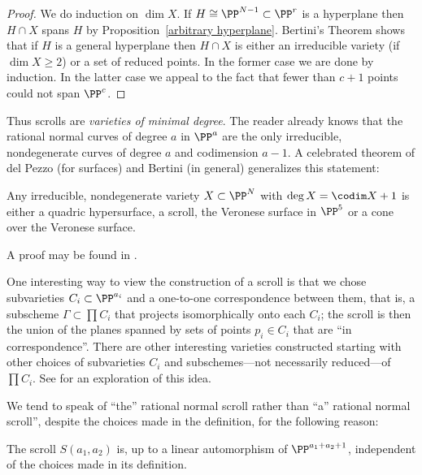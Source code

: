\begin{proof} We do induction on $\dim X$. If $H\cong \PP^{N-1}\subset \PP^r$ is a hyperplane then $H\cap X$ spans
$H$ by Proposition~\ref{arbitrary hyperplane}. Bertini's Theorem shows that if $H$ is a general hyperplane then $H\cap X$ is either an irreducible variety 
(if $\dim X\geq 2$) or a set of reduced points. In the former case we are done by induction. In the latter case
we appeal to the fact that fewer than $c+1$ points could not span $\PP^c$.
 \end{proof}

Thus scrolls are \emph{varieties of minimal degree}. The reader already knows that the rational normal curves of degree $a$ in $\PP^{a}$ are the only irreducible, nondegenerate curves of degree $a$ and codimension $a-1$. A celebrated theorem of del Pezzo (for surfaces) and Bertini (in general) generalizes this statement:

\begin{fact}\label{classification of scrolls} 
Any irreducible, nondegenerate variety $X\subset \PP^{N}$  with $\deg X = \codim X+1$ is either a quadric hypersurface, a scroll, the Veronese surface in $\PP^{5}$ or a cone over the Veronese surface.
\end{fact}

A proof may be found in \cite{Eisenbud-Harris-Centennial}.

One interesting way to view the construction of a scroll is that we chose subvarieties $C_{i}\subset \PP^{a_{i}}$ and a one-to-one correspondence between them, that is, a subscheme
$\Gamma\subset \prod C_{i}$ that projects isomorphically onto each $C_{i}$; the scroll is then the
union of the planes spanned by sets of points $p_{i}\in C_{i}$ that are ``in correspondence''. There are other interesting varieties constructed starting with other choices of subvarieties $C_{i}$ and subschemes---not necessarily reduced---of $\prod C_{i}$. See \cite{Eisenbud-Sammartano} for an exploration of this idea.

We tend to speak of ``the'' rational normal scroll rather than ``a'' rational normal scroll'', despite the choices made in the definition, for the following reason:

\begin{proposition}\label{uniqueness of scrolls}
The scroll $S(a_1,a_2)$ is, up to a linear automorphism of $\PP^{a_1+a_2+1}$, independent of the choices made in its
 definition. 
\end{proposition}

